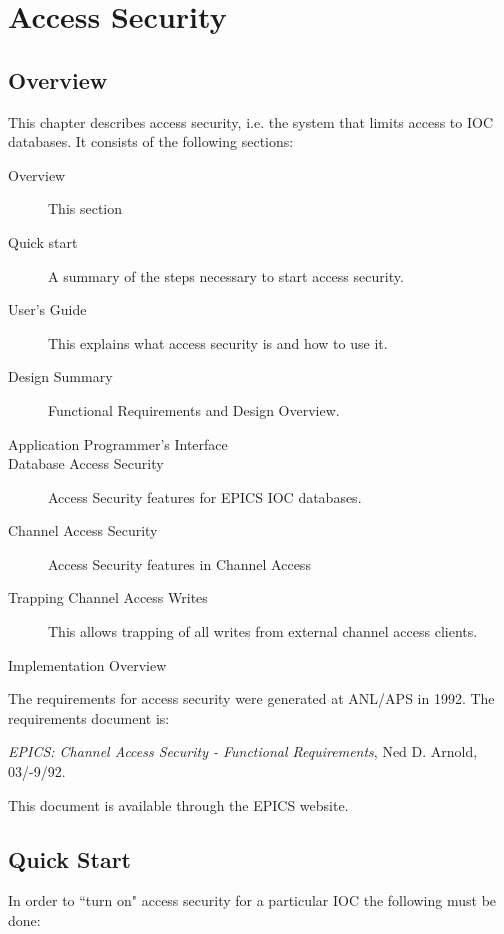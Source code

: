 \chapter{Access Security}
\label{Access Security}

\section{Overview}

This chapter describes access security, i.e. the system that limits access to IOC databases.
It consists of the following sections:

\begin{description}
\item [Overview] This section
\item [Quick start] A summary of the steps necessary to start access security.
\item [User's Guide] This explains what access security is and how to use it.
\item [Design Summary] Functional Requirements and Design Overview.
\item [Application Programmer's Interface]
\item [Database Access Security] Access Security features for EPICS IOC databases.
\item [Channel Access Security] Access Security features in Channel Access
\item [Trapping Channel Access Writes] This allows trapping of all writes from external channel access clients.
\item [Implementation Overview]
\end{description}

The requirements for access security were generated at ANL/APS in 1992. The requirements document is:

\emph{EPICS: Channel Access Security - Functional Requirements}, Ned D. Arnold, 03/-9/92.

This document is available through the EPICS website.

\section{Quick Start}

In order to ``turn on" access security for a particular IOC the following must be done:

